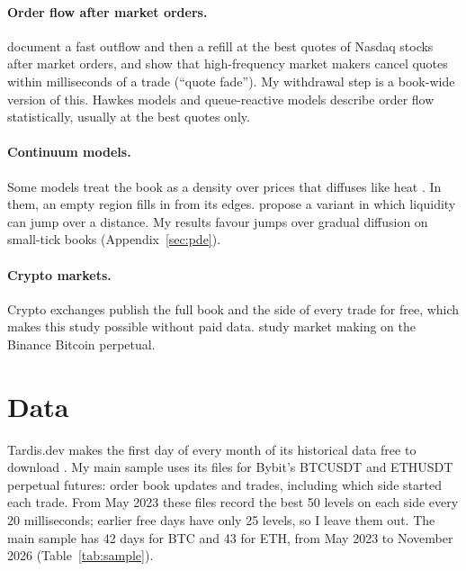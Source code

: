 \documentclass[12pt]{article}
\begin{document}
\paragraph{Order flow after market orders.} \citet{bonart2017latency} document a fast outflow and
then a refill at the best quotes of Nasdaq stocks after market orders, and
\citet{MalinovaPark2016} show that high-frequency market makers cancel quotes within milliseconds
of a trade (``quote fade''). My withdrawal step is a book-wide version of this. Hawkes models
\citep{bacry2015hawkes} and queue-reactive models \citep{huang2015queue} describe order flow
statistically, usually at the best quotes only.

\paragraph{Continuum models.} Some models treat the book as a density over prices that diffuses
like heat \citep{donier2015minimal,mastromatteo2014anomalous,cont2021spde}. In them, an empty
region fills in from its edges. \citet{benzaquen2018fractional} propose a variant in which
liquidity can jump over a distance. My results favour jumps over gradual diffusion on small-tick
books (Appendix~\ref{sec:pde}).

\paragraph{Crypto markets.} Crypto exchanges publish the full book and the side of every trade
for free, which makes this study possible without paid data. \citet{albers2025dilemma} study
market making on the Binance Bitcoin perpetual.

\section{Data}
\label{sec:data}

Tardis.dev makes the first day of every month of its historical data free to download
\citep{tardis}. My main sample uses its files for Bybit's BTCUSDT and ETHUSDT perpetual futures:
order book updates and trades, including which side started each trade. From May 2023 these
files record the best 50 levels on each side every 20 milliseconds; earlier free days have only
25 levels, so I leave them out. The main sample has 42 days for BTC and 43 for ETH, from May 2023
to November 2026 (Table~\ref{tab:sample}).
\end{document}
